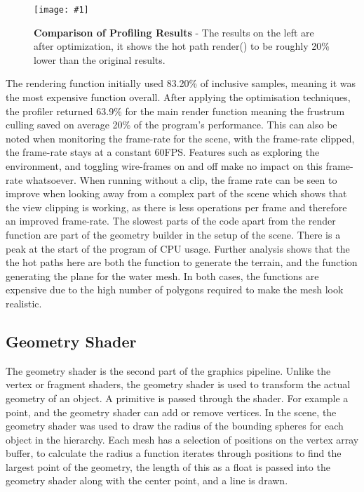 \documentclass[conference]{acmsiggraph}
\newcommand{\figuremacroW}[4]{
	\begin{figure}[h] %
		\centering
		\texttt{[image: \#1]}
		\caption[#2]{\textbf{#2} - #3}
		\label{fig:#1}
	\end{figure}
}
\begin{document}
\figuremacroW
{compare}
{Comparison of Profiling Results}
{The results on the left are after optimization, it shows the hot path render() to be roughly 20\% lower than the original results.}
{1.0}

The rendering function initially used 83.20\% of inclusive samples, meaning it was the most expensive function overall. After applying the optimisation techniques, the profiler returned 63.9\% for the main render function meaning the frustrum culling saved on average 20\% of the program's performance. This can also be noted when monitoring the frame-rate for the scene, with the frame-rate clipped, the frame-rate stays at a constant 60FPS. Features such as exploring the environment, and toggling wire-frames on and off make no impact on this frame-rate whatsoever. When running without a clip, the frame rate can be seen to improve when looking away from a complex part of the scene which shows that the view clipping is working, as there is less operations per frame and therefore an improved frame-rate. The slowest parts of the code apart from the render function are part of the geometry builder in the setup of the scene. There is a peak at the start of the program of CPU usage. Further analysis shows that the the hot paths here are both the function to generate the terrain, and the function generating the plane for the water mesh. In both cases, the functions are expensive due to the high number of polygons required to make the mesh look realistic. 


\subsection{Geometry Shader}
The geometry shader is the second part of the graphics pipeline. Unlike the vertex or fragment shaders, the geometry shader is used to transform the actual geometry of an object. A primitive is passed through the shader. For example a point, and the geometry shader can add or remove vertices. In the scene, the geometry shader was used to draw the radius of the bounding spheres for each object in the hierarchy. Each mesh has a selection of positions on the vertex array buffer, to calculate the radius a function iterates through positions to find the largest point of the geometry, the length of this as a float is passed into the geometry shader along with the center point, and a line is drawn.
\end{document}

